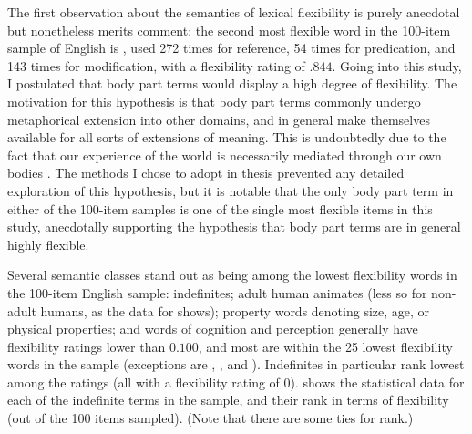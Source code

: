 The first observation about the semantics of lexical flexibility is purely anecdotal but nonetheless merits comment: the second most flexible word in the 100-item sample of English is , used 272 times for reference, 54 times for predication, and 143 times for modification, with a flexibility rating of $.844$. Going into this study, I postulated that body part terms would display a high degree of flexibility. The motivation for this hypothesis is that body part terms commonly undergo metaphorical extension into other domains, and in general make themselves available for all sorts of extensions of meaning. This is undoubtedly due to the fact that our experience of the world is necessarily mediated through our own bodies . The methods I chose to adopt in thesis prevented any detailed exploration of this hypothesis, but it is notable that the only body part term in either of the 100-item samples is one of the single most flexible items in this study, anecdotally supporting the hypothesis that body part terms are in general highly flexible.

Several semantic classes stand out as being among the lowest flexibility words in the 100-item English sample: indefinites; adult human animates (less so for non-adult humans, as the data for  shows); property words denoting size, age, or physical properties; and words of cognition and perception generally have flexibility ratings lower than $0.100$, and most are within the 25 lowest flexibility words in the sample (exceptions are , , and ). Indefinites in particular rank lowest among the ratings (all with a flexibility rating of $0$).  shows the statistical data for each of the indefinite terms in the sample, and their rank in terms of flexibility (out of the 100 items sampled). (Note that there are some ties for rank.)

